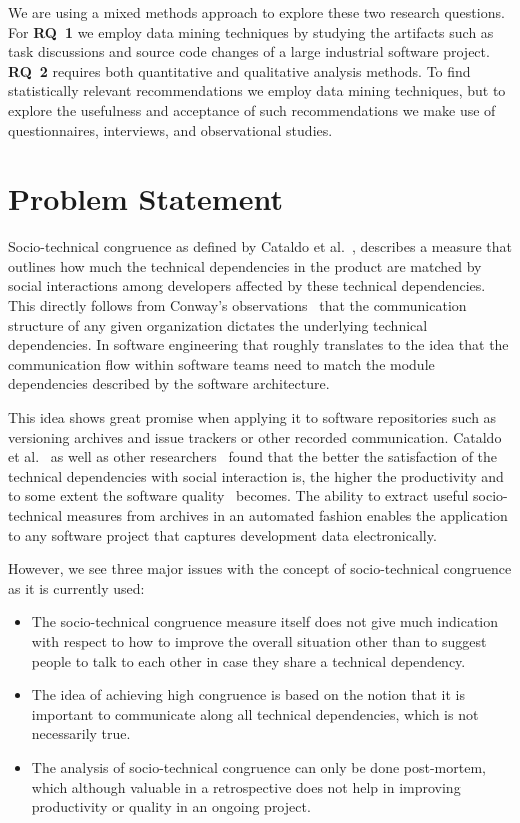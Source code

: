 We are using a mixed methods approach to explore these two research questions.
For \textbf{RQ~1} we employ data mining techniques by studying the artifacts such as task discussions and source code changes of a large industrial software project.
\textbf{RQ~2} requires both quantitative and qualitative analysis methods.
To find statistically relevant recommendations we employ data mining techniques, but to explore the usefulness and acceptance of such recommendations we make use of questionnaires, interviews, and observational studies.

\section{Problem Statement}
Socio-technical congruence as defined by Cataldo et al.~\cite{cataldo:cscw:2006}, describes a measure that outlines how much the technical dependencies in the product are matched by social interactions among developers affected by these technical dependencies.
This directly follows from Conway's observations~\cite{conway:datamination:1968} that the communication structure of any given organization dictates the underlying technical dependencies.
In software engineering that roughly translates to the idea that the communication flow within software teams need to match the module dependencies described by the software architecture. 
 
This idea shows great promise when applying it to software repositories such as versioning archives and issue trackers or other recorded communication.
Cataldo et al.~\cite{cataldo:cscw:2006,cataldo:esem:2008} as well as other researchers~\cite{valetto:msr:2007,ehrlich:stc:2008} found that the better the satisfaction of the technical dependencies with social interaction is, the higher the productivity and to some extent the software quality~\cite{kwan:tse:2011,bird:issre:2009,kwan:stc:2009} becomes.
The ability to extract useful socio-technical measures from archives in an automated fashion enables the application to any software project that captures development data electronically.

However, we see three major issues with the concept of socio-technical congruence as it is currently used:
\begin{itemize}
\item The socio-technical congruence measure itself does not give much indication with respect to how to improve the overall situation other than to suggest people to talk to each other in case they share a technical dependency. 
\item The idea of achieving high congruence is based on the notion that it is important to communicate along all technical dependencies, which is not necessarily true.
\item The analysis of socio-technical congruence can only be done post-mortem, which although valuable in a retrospective does not help in improving productivity or quality in an ongoing project.
\end{itemize}

